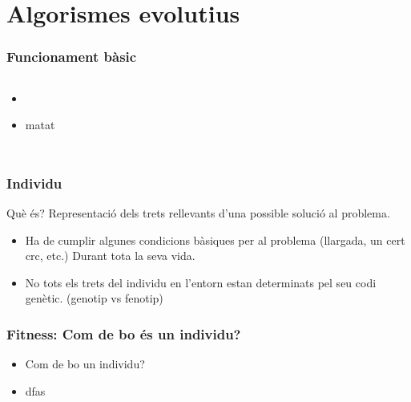 \documentclass{beamer}
\begin{document}
\section{Algorismes evolutius} %
\label{sec:Algorismes evolutius}

\begin{frame}
	\frametitle{Funcionament bàsic}
	\begin{columns}[c]
		\begin{itemize}
			\item 
				\pause
			\item matat
		\end{itemize}
	\end{columns}
\end{frame}

\begin{frame}
	\frametitle{Individu}
	\begin{block}{Què és?}
		Representació dels trets rellevants d'una possible solució al problema.
	 \end{block}
	\pause
	\begin{itemize}
		\item Ha de cumplir algunes condicions bàsiques per al problema (llargada, un cert crc,
			etc.) Durant tota la seva vida.
		\item No tots els trets del individu en l'entorn estan determinats pel seu codi genètic.
			(genotip vs fenotip)
	\end{itemize}
\end{frame}

\begin{frame}
	\frametitle{Fitness: Com de bo és un individu?}
	\begin{itemize}
		\item Com de bo un individu?
			\pause
		\item dfas
	\end{itemize}
\end{frame}
\end{document}
